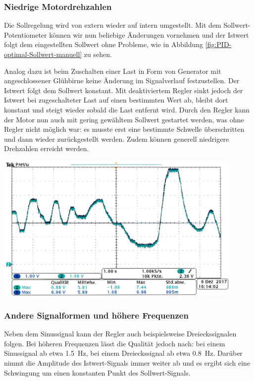 \subsubsection*{Niedrige Motordrehzahlen}
%
Die Sollregelung wird von extern wieder auf intern umgestellt.
Mit dem Sollwert-Potentiometer können wir nun beliebige Änderungen vornehmen und der Istwert folgt dem eingestellten Sollwert ohne Probleme, wie in Abbildung \ref{fig:PID-optimal-Sollwert-manuell} zu sehen.
%
\par
%
Analog dazu ist beim Zuschalten einer Last in Form von Generator mit angeschlossener Glühbirne keine Änderung im Signalverlauf festzustellen.
Der Istwert folgt dem Sollwert konstant.
Mit deaktiviertem Regler sinkt jedoch der Istwert bei zugeschalteter Last auf einen bestimmten Wert ab, bleibt dort konstant und steigt wieder sobald die Last entfernt wird.
Durch den Regler kann der Motor nun auch mit gering gewähltem Sollwert gestartet werden, was ohne Regler nicht möglich war: es musste erst eine bestimmte Schwelle überschritten und dann wieder zurückgestellt werden.
Zudem können generell niedrigere Drehzahlen erreicht werden.
%
\par
%
\minipage{\linewidth}
    \begin{center}
        \captionsetup{type=figure}
        \begin{adjustbox}{max width=\linewidth, keepaspectratio}
            \includegraphics[width=120mm]{jpg/PID-optimal-Sollwert-manuell}
        \end{adjustbox}
        \label{fig:PID-optimal-Sollwert-manuell}
    \end{center}
\endminipage
%
\subsubsection*{Andere Signalformen und höhere Frequenzen}
%
Neben dem Sinussignal kann der Regler auch beispielsweise Dreieckssignalen folgen.
Bei höheren Frequenzen lässt die Qualität jedoch nach: bei einem Sinussignal ab etwa \SI{1,5}{\hertz}, bei einem Dreieckssignal ab etwa \SI{0,8}{\hertz}.
Darüber nimmt die Amplitude des Istwert-Signals immer weiter ab und es ergibt sich eine Schwingung um einen konstanten Punkt des Sollwert-Signals.
%
